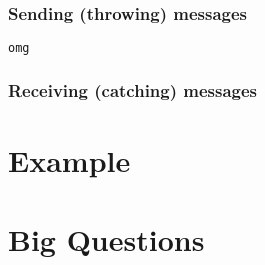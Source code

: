 \documentclass[sigplan,screen,review,anonymous]{acmart}
\begin{document}
\subsubsection{Sending (throwing) messages}

\begin{lstlisting}[language=Haskell]
omg
\end{lstlisting}

\subsubsection{Receiving (catching) messages}





\section{Example}




\section{Big Questions}
\end{document}

